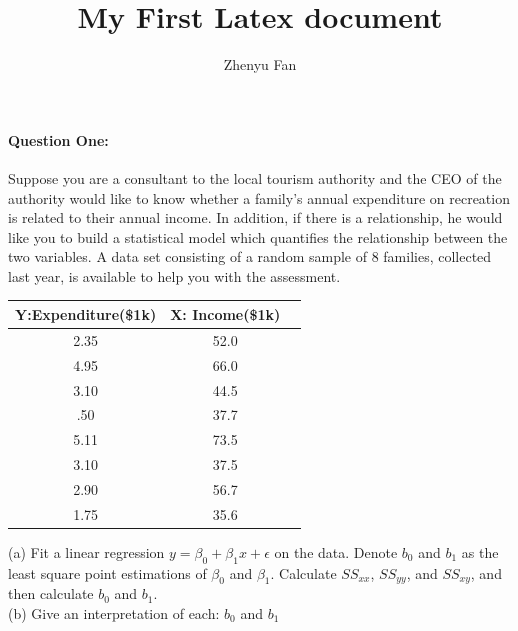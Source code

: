 \documentclass[UTF8]{article}
\author {Zhenyu Fan}
\title {My First Latex document}
\begin{document}
\maketitle
  \paragraph{Question One:}
  Suppose you are a consultant to the local tourism authority and the CEO
  of the authority would like to know whether a family’s annual expenditure on
  recreation is related to their annual income. In addition, if there is a
  relationship, he would like you to build a statistical model which quantifies
  the relationship between the two variables. A data set consisting of a random
  sample of 8 families, collected last year, is available to help you with the
  assessment.
  \\
  \begin{tabular}{ccc}
    \hline
      Y:Expenditure(\$1k) & X: Income(\$1k)\\
    \hline
      2.35 & 52.0\\
      4.95 & 66.0\\
      3.10 & 44.5\\
      .50 & 37.7\\
      5.11 & 73.5\\
      3.10 & 37.5\\
      2.90 & 56.7\\
      1.75 & 35.6\\
    \hline
  \end{tabular}

  (a) Fit a linear regression $y = \beta_0 + \beta_1 x + \epsilon$ on the data.
  Denote $b_0$ and $b_1$ as the least square point estimations of $\beta_0$ and $\beta_1$.
  Calculate $SS_{xx}$, $SS_{yy}$, and $SS_{xy}$, and then calculate $b_0$ and $b_1$.
  \\
  (b) Give an interpretation of each: $b_0$ and $b_1$ \\
  \\
\end{document}

